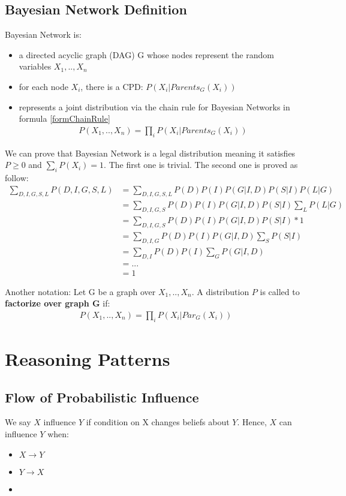 \subsection{Bayesian Network Definition}
Bayesian Network is:
\begin{itemize}
	\item a directed acyclic graph (DAG) G whose nodes represent the random variables $X_1,..,X_n$
	\item for each node $X_i$, there is a CPD: $P(X_i | Parents_G(X_i))$
	\item represents a joint distribution via the chain rule for Bayesian Networks in formula \ref{formChainRule} 
	\begin{align}\label{formChainRule}
	P(X_1,..,X_n) = \prod_i P(X_i|Parents_G(X_i))
	\end{align}
\end{itemize}
We can prove that Bayesian Network is a legal distribution meaning it satisfies $P \geq 0$ and $\sum_i P(X_i) = 1$. The first one is trivial. The second one is proved as follow:
\begin{align*}
\sum_{D,I,G,S,L} P(D,I,G,S,L) 	&= \sum_{D,I,G,S,L} P(D)P(I)P(G|I,D)P(S|I)P(L|G) \\
								&= \sum_{D,I,G,S} P(D)P(I)P(G|I,D)P(S|I) \sum_L P(L|G) \\
								&= \sum_{D,I,G,S} P(D)P(I)P(G|I,D)P(S|I) * 1\\
								&= \sum_{D,I,G} P(D)P(I)P(G|I,D) \sum_S P(S|I)\\
								&= \sum_{D,I} P(D)P(I) \sum_G P(G|I,D)\\
								&= ...\\
								&= 1
\end{align*}

Another notation: Let G be a graph over $X_1, .., X_n$. A distribution $P$ is called to \textbf{factorize over graph G} if:
\begin{align*}
P(X_1, .., X_n) = \prod_i P(X_i | Par_G(X_i))
\end{align*}

\section{Reasoning Patterns}

\subsection{Flow of Probabilistic Influence}
We say $X$ influence $Y$ if condition on X changes beliefs about $Y$. Hence, $X$ can influence $Y$ when:
\begin{itemize}
	\item $X \rightarrow Y$
	\item $Y \rightarrow X$
	\item 
\end{itemize}

